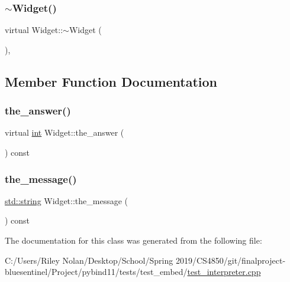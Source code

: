 \mbox{\label{class_widget_abe38c3c1fbcde4c705d76d58208ceb52}} 
\subsubsection{\texorpdfstring{$\sim$Widget()}{~Widget()}}
{\footnotesize\ttfamily virtual Widget\+::$\sim$\+Widget (\begin{DoxyParamCaption}{ }\end{DoxyParamCaption})\hspace{0.3cm}{\ttfamily [virtual]}, {\ttfamily [default]}}



\subsection{Member Function Documentation}
\mbox{\label{class_widget_a30a0f7c911d2e945e1cb5bb9d1d28c92}} 
\subsubsection{\texorpdfstring{the\_answer()}{the\_answer()}}
{\footnotesize\ttfamily virtual \mbox{\hyperlink{warnings_8h_a74f207b5aa4ba51c3a2ad59b219a423b}{int}} Widget\+::the\+\_\+answer (\begin{DoxyParamCaption}{ }\end{DoxyParamCaption}) const\hspace{0.3cm}{\ttfamily [pure virtual]}}

\mbox{\label{class_widget_abd155dd94b1576e39312bf5999518622}} 
\subsubsection{\texorpdfstring{the\_message()}{the\_message()}}
{\footnotesize\ttfamily \mbox{\hyperlink{_s_d_l__opengl__glext_8h_ab4ccfaa8ab0e1afaae94dc96ef52dde1}{std\+::string}} Widget\+::the\+\_\+message (\begin{DoxyParamCaption}{ }\end{DoxyParamCaption}) const\hspace{0.3cm}{\ttfamily [inline]}}



The documentation for this class was generated from the following file\+:\begin{DoxyCompactItemize}
\item 
C\+:/\+Users/\+Riley Nolan/\+Desktop/\+School/\+Spring 2019/\+C\+S4850/git/finalproject-\/bluesentinel/\+Project/pybind11/tests/test\+\_\+embed/\mbox{\hyperlink{test__interpreter_8cpp}{test\+\_\+interpreter.\+cpp}}\end{DoxyCompactItemize}
